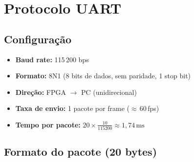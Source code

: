 \documentclass[12pt,a4paper]{article}
\begin{document}
\section{Protocolo UART}

\subsection{Configuração}

\begin{itemize}
    \item \textbf{Baud rate:} 115\,200 bps
    \item \textbf{Formato:} 8N1 (8 bits de dados, sem paridade, 1 stop bit)
    \item \textbf{Direção:} FPGA $\rightarrow$ PC (unidirecional)
    \item \textbf{Taxa de envio:} 1 pacote por frame ($\approx$\,60\,fps)
    \item \textbf{Tempo por pacote:} $20 \times \frac{10}{115200} \approx 1{,}74\,\text{ms}$
\end{itemize}

\subsection{Formato do pacote (20 bytes)}
\end{document}
